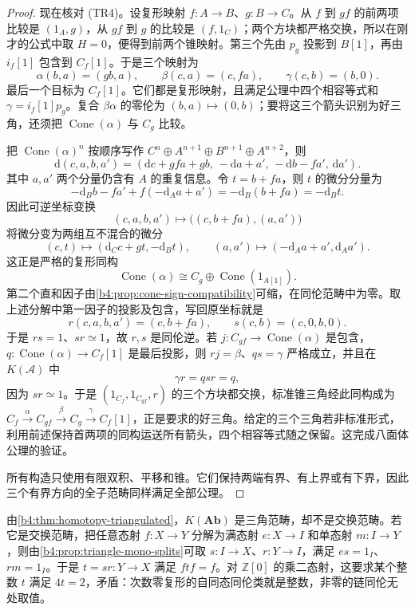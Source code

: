 \begin{proof}
	现在核对 (TR4)。设复形映射 \(f:A\to B\)、\(g:B\to C\)。从 \(f\) 到 \(gf\) 的前两项比较是 \((1_A,g)\)，从 \(gf\) 到 \(g\) 的比较是 \((f,1_C)\)；两个方块都严格交换，所以在刚才的公式中取 \(H=0\)，便得到前两个锥映射。第三个先由 \(p_g\) 投影到 \(B[1]\)，再由 \(i_f[1]\) 包含到 \(C_f[1]\)。于是三个映射为
	\[
		\alpha(b,a)=(gb,a),\qquad \beta(c,a)=(c,fa),\qquad \gamma(c,b)=(b,0).
	\]
	最后一个目标为 \(C_f[1]\)。它们都是复形映射，且满足公理中四个相容等式和 \(\gamma=i_f[1]p_g\)。复合 \(\beta\alpha\) 的零伦为 \((b,a)\mapsto(0,b)\)；要将这三个箭头识别为好三角，还须把 \(\operatorname{Cone}(\alpha)\) 与 \(C_g\) 比较。

	把 \(\operatorname{Cone}(\alpha)^n\) 按顺序写作 \(C^n\oplus A^{n+1}\oplus B^{n+1}\oplus A^{n+2}\)，则
	\[
		\mathrm{d}(c,a,b,a')=(\mathrm{d}c+gf a+gb,\,-\mathrm{d}a+a',\,-\mathrm{d}b-fa',\,\mathrm{d}a').
	\]
	其中 \(a,a'\) 两个分量仍含有 \(A\) 的重复信息。令 \(t=b+fa\)，则 \(t\) 的微分分量为
	\[
		-\mathrm{d}_Bb-fa'+f(-\mathrm{d}_Aa+a') =-\mathrm{d}_B(b+fa)=-\mathrm{d}_Bt.
	\]
	因此可逆坐标变换
	\[
		(c,a,b,a')\longmapsto\bigl((c,b+fa),(a,a')\bigr)
	\]
	将微分变为两组互不混合的微分
	\[
		(c,t)\longmapsto(\mathrm{d}_Cc+gt,-\mathrm{d}_Bt),\qquad (a,a')\longmapsto(-\mathrm{d}_Aa+a',\mathrm{d}_Aa').
	\]
	这正是严格的复形同构
	\[
		\operatorname{Cone}(\alpha)\cong C_g\oplus\operatorname{Cone}(1_{A[1]}).
	\]
	第二个直和因子由\cref{b4:prop:cone-sign-compatibility}可缩，在同伦范畴中为零。取上述分解中第一因子的投影及包含，写回原坐标就是
	\[
		r(c,a,b,a')=(c,b+fa),\qquad s(c,b)=(c,0,b,0).
	\]
	于是 \(rs=1\)、\(sr\simeq1\)，故 \(r,s\) 是同伦逆。若 \(j:C_{gf}\to\operatorname{Cone}(\alpha)\) 是包含，\(q:\operatorname{Cone}(\alpha)\to C_f[1]\) 是最后投影，则 \(rj=\beta\)、\(qs=\gamma\) 严格成立，并且在 \(K(\mathcal A)\) 中
	\[
		\gamma r=qsr=q,
	\]
	因为 \(sr\simeq1\)。于是 \((1_{C_f},1_{C_{gf}},r)\) 的三个方块都交换，标准锥三角经此同构成为 \(C_f\xrightarrow{\alpha}C_{gf}\xrightarrow{\beta}C_g\xrightarrow{\gamma}C_f[1]\)，正是要求的好三角。给定的三个三角若非标准形式，利用前述保持首两项的同构运送所有箭头，四个相容等式随之保留。这完成八面体公理的验证。

	所有构造只使用有限双积、平移和锥。它们保持两端有界、有上界或有下界，因此三个有界方向的全子范畴同样满足全部公理。
\end{proof}

由\cref{b4:thm:homotopy-triangulated}，\(K(\mathbf{Ab})\) 是三角范畴，却不是交换范畴。若它是交换范畴，把任意态射 \(f:X\to Y\) 分解为满态射 \(e:X\to I\) 和单态射 \(m:I\to Y\)，则由\cref{b4:prop:triangle-mono-splits}可取 \(s:I\to X\)、\(r:Y\to I\)，满足 \(es=1_I\)、\(rm=1_I\)。于是 \(t=sr:Y\to X\) 满足 \(ftf=f\)。对 \(\mathbb Z[0]\) 的乘二态射，这要求某个整数 \(t\) 满足 \(4t=2\)，矛盾：次数零复形的自同态同伦类就是整数，非零的链同伦无处取值。

